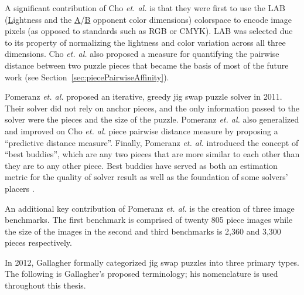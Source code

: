 \documentclass{report}
\begin{document}
A significant contribution of Cho \textit{et. al.} is that they were first to use the LAB  (\underline{L}ightness and the \underline{A}/\underline{B} opponent color dimensions) colorspace to encode image pixels (as opposed to standards such as RGB or CMYK).  LAB was selected due to its property of normalizing the lightness and color variation across all three dimensions.  Cho \textit{et. al.} also proposed a measure for quantifying the pairwise distance between two puzzle pieces that became the basis of most of the future work (see Section~\ref{sec:piecePairwiseAffinity}).  

Pomeranz \textit{et. al.} \cite{pomeranz2011} proposed an iterative, greedy jig swap puzzle solver in 2011.  Their solver did not rely on anchor pieces, and the only information passed to the solver were the pieces and the size of the puzzle.  Pomeranz \textit{et. al.} also generalized and improved on Cho \textit{et. al.} piece pairwise distance measure by proposing a ``predictive distance measure''.  Finally, Pomeranz \textit{et. al.} introduced the concept of ``best buddies'', which are any two pieces that are more similar to each other than they are to any other piece.  Best buddies have served as both an estimation metric for the quality of solver result as well as the foundation of some solvers' placers \cite{paikin2015}.

An additional key contribution of Pomeranz \textit{et. al.} is the creation of three image benchmarks.  The first benchmark is comprised of twenty 805 piece images while the size of the images in the second and third benchmarks is 2,360 and 3,300 pieces respectively.

In 2012, Gallagher \cite{gallagher2012} formally categorized jig swap puzzles into three primary types.  The following is Gallagher's proposed terminology; his nomenclature is used throughout this thesis.
\end{document}
